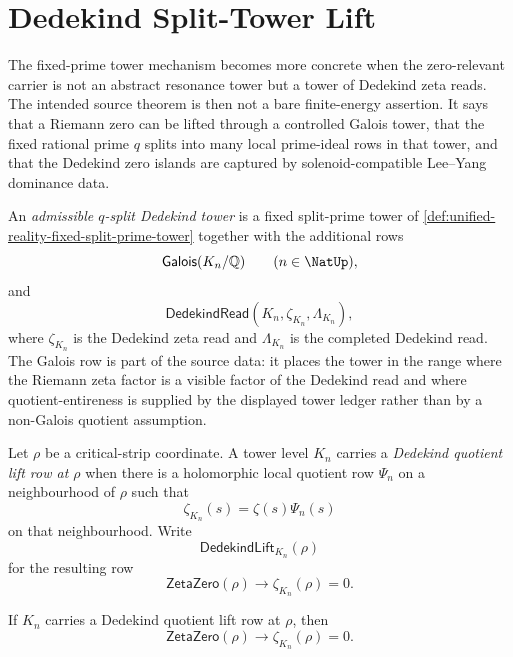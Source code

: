 \section{Dedekind Split-Tower Lift}
\label{sec:unified-reality-dedekind-split-tower-lift}

The fixed-prime tower mechanism becomes more concrete when the
zero-relevant carrier is not an abstract resonance tower but a tower of
Dedekind zeta reads.  The intended source theorem is then not a bare
finite-energy assertion.  It says that a Riemann zero can be lifted
through a controlled Galois tower, that the fixed rational prime $q$
splits into many local prime-ideal rows in that tower, and that the
Dedekind zero islands are captured by solenoid-compatible Lee--Yang
dominance data.

\begin{definition}
\label{def:unified-reality-admissible-q-split-dedekind-tower}
An \emph{admissible $q$-split Dedekind tower} is a fixed split-prime
tower of \autoref{def:unified-reality-fixed-split-prime-tower} together
with the additional rows
$$
\mathsf{Galois}(K_n/\mathbb Q)
\qquad
(n\in\NatUp),
$$
and
$$
\mathsf{DedekindRead}(K_n,\zeta_{K_n},\Lambda_{K_n}),
$$
where $\zeta_{K_n}$ is the Dedekind zeta read and $\Lambda_{K_n}$ is the
completed Dedekind read.  The Galois row is part of the source data: it
places the tower in the range where the Riemann zeta factor is a visible
factor of the Dedekind read and where quotient-entireness is supplied by
the displayed tower ledger rather than by a non-Galois quotient
assumption.
\end{definition}

\begin{definition}
\label{def:unified-reality-dedekind-quotient-lift-row}
Let $\rho$ be a critical-strip coordinate.  A tower level $K_n$ carries
a \emph{Dedekind quotient lift row at $\rho$} when there is a
holomorphic local quotient row $\Psi_n$ on a neighbourhood of $\rho$
such that
$$
\zeta_{K_n}(s)=\zeta(s)\Psi_n(s)
$$
on that neighbourhood.  Write
$$
\mathsf{DedekindLift}_{K_n}(\rho)
$$
for the resulting row
$$
\mathsf{ZetaZero}(\rho)\to\zeta_{K_n}(\rho)=0.
$$
\end{definition}

\begin{theorem}
\label{thm:unified-reality-dedekind-quotient-rows-lift-riemann-zeros}
If $K_n$ carries a Dedekind quotient lift row at $\rho$, then
$$
\mathsf{ZetaZero}(\rho)
\to
\zeta_{K_n}(\rho)=0.
$$
\end{theorem}

